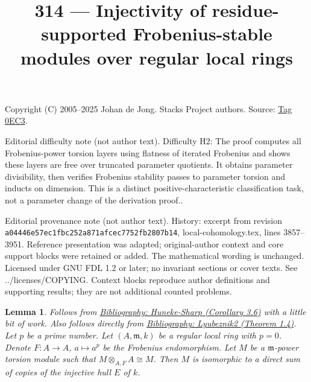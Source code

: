 \documentclass{amsart}
\newenvironment{reference}{\comment}{\endcomment}
\theoremstyle{plain}
\newtheorem{lemma}[subsection]{Lemma}
\theoremstyle{definition}
\theoremstyle{remark}
\numberwithin{equation}{subsection}
\begin{document}
\title[Stacks Project, Tag 0EC3]{314 --- Injectivity of residue-supported Frobenius-stable modules over regular local rings}
\maketitle
\noindent Copyright (C) 2005--2025 Johan de Jong. Stacks Project authors. Source: \href{https://stacks.math.columbia.edu/tag/0EC3}{Tag 0EC3}.

\noindent Editorial difficulty note (not author text). Difficulty H2: The proof computes all Frobenius-power torsion layers using flatness of iterated Frobenius and shows these layers are free over truncated parameter quotients. It obtains parameter divisibility, then verifies Frobenius stability passes to parameter torsion and inducts on dimension. This is a distinct positive-characteristic classification task, not a parameter change of the derivation proof..

\noindent Editorial provenance note (not author text). History: excerpt from revision \texttt{a0444\allowbreak 6e57e\allowbreak c1fbc\allowbreak 252a8\allowbreak 71afc\allowbreak ec775\allowbreak 2fb28\allowbreak 07b14}, local-cohomology.tex, lines 3857--3951. Reference presentation was adapted; original-author context and core support blocks were retained or added. The mathematical wording is unchanged. Licensed under GNU FDL 1.2 or later; no invariant sections or cover texts. See ../licenses/COPYING. Context blocks reproduce author definitions and supporting results; they are not additional counted problems.

\begin{lemma}
\label{lemma-structure-torsion-Frobenius-regular}
\begin{reference}
Follows from \href{https://stacks.math.columbia.edu/bibliography}{Bibliography: Huneke-Sharp (Corollary 3.6)} with a
little bit of work. Also follows directly from
\href{https://stacks.math.columbia.edu/bibliography}{Bibliography: Lyubeznik2 (Theorem 1.4)}.
\end{reference}
Let $p$ be a prime number. Let $(A, \mathfrak m, k)$
be a regular local ring with $p = 0$. Denote $F : A \to A$, $a \mapsto a^p$
be the Frobenius endomorphism. Let $M$ be a $\mathfrak m$-power torsion module
such that $M \otimes_{A, F} A \cong M$. Then $M$ is isomorphic to a direct sum
of copies of the injective hull $E$ of $k$.
\end{lemma}
\end{document}
